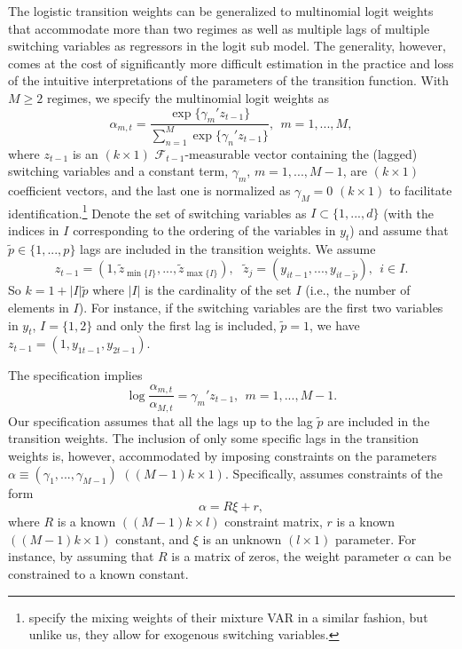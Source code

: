 \documentclass[nojss]{jss}
\begin{document}
The logistic transition weights can be generalized to multinomial logit weights that accommodate more than two regimes as well as multiple lags of multiple switching variables as regressors in the logit sub model. The generality, however, comes at the cost of significantly more difficult estimation in the practice and loss of the intuitive interpretations of the parameters of the transition function.  With $M\geq 2$ regimes, we specify the multinomial logit weights as
\begin{equation}\label{eq:logistic_alphas}
\alpha_{m,t} = \frac{\exp\lbrace{\gamma_m'z_{t-1}\rbrace}}{\sum_{n=1}^M \exp\lbrace{\gamma_n'z_{t-1} \rbrace}}, \ \ m=1,...,M,
\end{equation}
where $z_{t-1}$ is an $(k\times 1)$ $\mathcal{F}_{t-1}$-measurable vector containing the (lagged) switching variables and a constant term, $\gamma_m$, $m=1,...,M-1$, are $(k\times 1)$ coefficient vectors, and the last one is normalized as $\gamma_M=0$ $(k\times 1)$ to facilitate identification.\footnote{\cite{Burgard+Neuenkirch+Nockel:2019} specify the mixing weights of their mixture VAR in a similar fashion, but unlike us, they allow for exogenous switching variables.}
Denote the set of switching variables as $I\subset \lbrace 1,...,d \rbrace$ (with the indices in $I$ corresponding to the ordering of the variables in $y_t$) and assume that $\tilde{p} \in \lbrace 1,...,p \rbrace$ lags are included in the transition weights. We assume
\begin{equation}
z_{t-1} = (1, \tilde{z}_{\min\lbrace I\rbrace},...,\tilde{z}_{\max\lbrace I\rbrace}), \ \ \ \tilde{z}_{j} =(y_{it-1},...,y_{it-\tilde{p}}), \ \ i\in I.
\end{equation}
So $k=1+|I|\tilde{p}$ where $|I|$ is the cardinality of the set $I$ (i.e., the number of elements in $I$). For instance, if the switching variables are the first two variables in $y_t$, $I=\lbrace 1,2 \rbrace$ and only the first lag is included, $\tilde{p}=1$, we have $z_{t-1} = (1,y_{1t-1}, y_{2t-1})$.

The specification implies
\begin{equation}
\log\frac{\alpha_{m,t}}{\alpha_{M,t}}=\gamma_m'z_{t-1}, \ \ m=1,...,M-1.
\end{equation}
Our specification assumes that all the lags up to the lag $\tilde{p}$ are included in the transition weights. The inclusion of only some specific lags in the transition weights is, however, accommodated by imposing constraints on the parameters $\alpha \equiv (\gamma_1,...,\gamma_{M-1})$ $((M-1)k\times 1)$. Specifically,  assumes constraints of the form
\begin{equation}\label{eq:weightconstraints}
\alpha = R\xi + r,
\end{equation}
where $R$ is a known $((M-1)k\times l)$ constraint matrix, $r$ is a known $((M-1)k\times 1)$ constant, and $\xi$ is an unknown $(l \times 1)$ parameter. For instance, by assuming that $R$ is a matrix of zeros, the weight parameter $\alpha$ can be constrained to a known constant.
\end{document}
